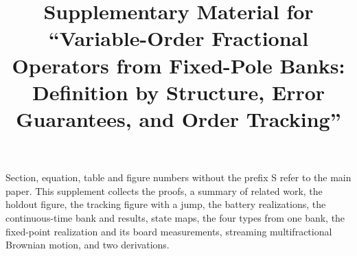 \documentclass[10pt]{article}
\title{Supplementary Material for ``Variable-Order Fractional Operators from Fixed-Pole Banks: Definition by Structure, Error Guarantees, and Order Tracking''}
\author{}
\date{}
\begin{document}
\maketitle
\noindent Section, equation, table and figure numbers without the prefix S refer to the main paper. This supplement collects the proofs, a summary of related work, the holdout figure, the tracking figure with a jump, the battery realizations, the continuous-time bank and results, state maps, the four types from one bank, the fixed-point realization and its board measurements, streaming multifractional Brownian motion, and two derivations.





\end{document}
